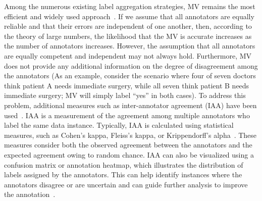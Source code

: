 \documentclass[pdflatex,bst/sn-basic]{bst/sn-jnl}%
\begin{document}
Among the numerous existing label aggregation strategies, MV remains the most efficient and widely used approach~\cite{tao_Label_2020}. If we assume that all annotators are equally reliable and that their errors are independent of one another, then, according to the theory of large numbers, the likelihood that the MV is accurate increases as the number of annotators increases. However, the assumption that all annotators are equally competent and independent may not always hold. Furthermore, MV does not provide any additional information on the degree of disagreement among the annotators (As an example, consider the scenario where four of seven doctors think patient A needs immediate surgery, while all seven think patient B needs immediate surgery; MV will simply label ``yes'' in both cases).
To address this problem, additional measures such as inter-annotator agreement (IAA) have been used~\cite{artstein_InterAnnotator_2017}. IAA is a measurement of the agreement among multiple annotators who label the same data instance. Typically, IAA is calculated using statistical measures, such as Cohen's kappa, Fleiss's kappa, or Krippendorff's alpha~\cite{krippendorff_Content_2018}. These measures consider both the observed agreement between the annotators and the expected agreement owing to random chance. IAA can also be visualized using a confusion matrix or annotation heatmap, which illustrates the distribution of labels assigned by the annotators. This can help identify instances where the annotators disagree or are uncertain and can guide further analysis to improve the annotation~\cite{carletta_Assessing_1996}.
\end{document}

